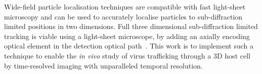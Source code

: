 Wide-field particle localisation techniques are compatible with fast \gls{light-sheet} microscopy and can be used to accurately localise particles to sub-diffraction limited positions in two dimensions.
Full three dimensional sub-diffraction limited tracking is viable using a \gls{light-sheet} microscope, by adding an axially encoding optical element in the detection optical path~\cite{spille_direct_2015}.%
This work is to implement such a technique to
enable the \textit{in vivo} study of virus trafficking through a 3D host cell by time-resolved imaging with unparalleled temporal resolution.

